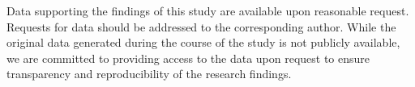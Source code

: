 \documentclass{gji}
\begin{document}
\begin{dataavailability}
Data supporting the findings of this study are available upon reasonable request. Requests for data should be addressed to the corresponding author.
While the original data generated during the course of the study is not publicly available, we are committed to providing access to the data upon request to ensure transparency and reproducibility of the research findings.
\end{dataavailability}












\bsp %

\label{lastpage}
\end{document}
